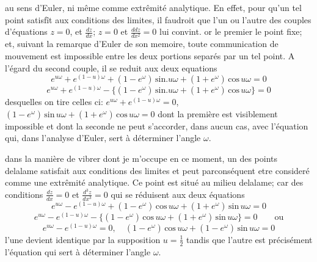 \documentclass[11pt,a4paper]{article}
\begin{document}

au sens d'Euler, ni même comme extrêmité analytique. En
effet, pour qu'un tel point satisfît aux conditions des
limites, il faudroit que l'un ou l'autre des couples d'équations
$z=0$, et $\frac{dz}{dx}$; $z=0$ et $\frac{ddz}{dx^2}=0$ lui convint. or le premier
  le point fixe; et, suivant la remarque
d'Euler   de son memoire, toute communication de
mouvement est impossible entre les deux portions separés
par un tel point. A l'égard du second couple, il se
reduit aux deux equations
\[ e^{u\omega} + e^{(1-u)\omega} + (1-e^{\omega})\,\text{sin}.u\omega + (1+e^{\omega})\,\text{cos}\,u\omega = 0 \]
\[ e^{u\omega} + e^{(1-u)\omega} - \{(1-e^{\omega})\,\text{sin}.u\omega + (1+e^{\omega})\,\text{cos}\,u\omega\} = 0 \]
desquelles on tire celles ci: $e^{u\omega} + e^{(1-u)\omega} = 0$, $(1-e^{\omega})\,\text{sin}\,u\omega + (1+e^{\omega})\,\text{cos}\,u\omega = 0$
dont la première est visiblement impossible et dont la seconde
ne peut s'accorder, dans aucun cas, avec l'équation qui,
dans l'analyse d'Euler, sert à déterminer l'angle $\omega$.

  dans la manière de vibrer dont je m'occupe
en ce moment, un des points delalame satisfait aux
conditions des limites et peut parconséquent etre consideré
comme une extrêmité analytique.  Ce
point est situé au milieu delalame; car des conditions
$\frac{dz}{dx}=0$ et $\frac{d^3z}{dx^3}=0$ qui se réduisent aux deux équations
\[ e^{u\omega} - e^{(1-u)\omega} + (1-e^{\omega})\,\text{cos}\,u\omega + (1+e^{\omega})\,\text{sin}\,u\omega = 0 \]
\[ e^{u\omega} - e^{(1-u)\omega} - \{(1-e^{\omega})\,\text{cos}\,u\omega + (1+e^{\omega})\,\text{sin}\,u\omega\} = 0 \qquad \text{ou} \]
\[ e^{u\omega} - e^{(1-u)\omega} = 0,\quad (1-e^{\omega})\,\text{cos}\,u\omega + (1-e^{\omega})\,\text{sin}\,u\omega = 0 \]
l'une devient
identique par la supposition $u=\frac{1}{2}$ tandis que l'autre est
précisément l'équation qui sert à déterminer l'angle $\omega$.
\end{document}
